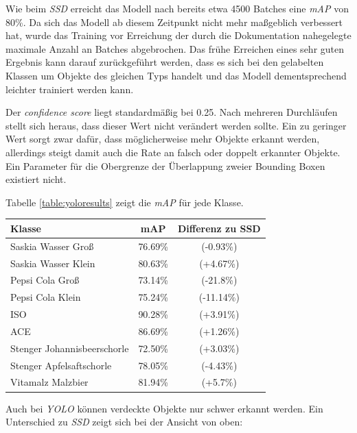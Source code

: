 Wie beim \textit{SSD} erreicht das Modell nach bereits etwa 4500 Batches eine \textit{mAP} von 80\%. Da sich das Modell ab diesem Zeitpunkt nicht mehr maßgeblich verbessert hat, wurde das Training vor Erreichung der durch die Dokumentation nahegelegte maximale Anzahl an Batches abgebrochen. Das frühe Erreichen eines sehr guten Ergebnis kann darauf zurückgeführt werden, dass es sich bei den gelabelten Klassen um Objekte des gleichen Typs handelt und das Modell dementsprechend leichter trainiert werden kann. 

Der \textit{confidence score} liegt standardmäßig bei 0.25. Nach mehreren Durchläufen stellt sich heraus, dass dieser Wert nicht verändert werden sollte. Ein zu geringer Wert sorgt zwar dafür, dass möglicherweise mehr Objekte erkannt werden, allerdings steigt damit auch die Rate an falsch oder doppelt erkannter Objekte. Ein Parameter für die Obergrenze der Überlappung zweier Bounding Boxen existiert nicht.

Tabelle \ref{table:yoloresults} zeigt die \textit{mAP} für jede Klasse.

\begin{center}
	\begin{tabular}[H]{l|c|c}
		Klasse & mAP & Differenz zu SSD\\
		\hline
		Saskia Wasser Groß & 76.69\% & (-0.93\%) \\
		Saskia Wasser Klein & 80.63\% & (+4.67\%) \\
		Pepsi Cola Groß & 73.14\% & (-21.8\%) \\
		Pepsi Cola Klein & 75.24\% & (-11.14\%) \\
		ISO & 90.28\% & (+3.91\%) \\
		ACE & 86.69\% & (+1.26\%) \\
		Stenger Johannisbeerschorle & 72.50\% & (+3.03\%) \\
		Stenger Apfelsaftschorle & 78.05\% & (-4.43\%) \\
		Vitamalz Malzbier & 81.94\% & (+5.7\%)
	\end{tabular}
	\label{table:yoloresults}
\end{center}

Auch bei \textit{YOLO} können verdeckte Objekte nur schwer erkannt werden. Ein Unterschied zu \textit{SSD} zeigt sich bei der Ansicht von oben:

